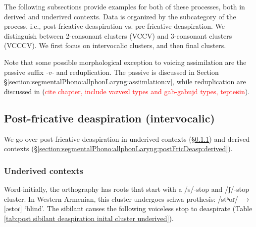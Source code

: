   	The following subsections provide examples for both of these processes, both in derived and underived contexts. Data is organized by the subcategory of the process, i.e., post-fricative deaspiration vs. pre-fricative deaspiration. We distinguish between 2-consonant clusters (VCCV) and 3-consonant clusters (VCCCV). We first focus on intervocalic clusters, and then final clusters. 
   	
   	Note that some possible morphological exception to voicing assimilation are the passive suffix \textit{-v-} and reduplication. The passive is discussed in Section \S\ref{section:segmentalPhono:allphonLaryng:assiimlation:v}, while reduplication are discussed in (\textcolor{red}{cite chapter, include vazvezl types and gab-gabujd types, tepteʁin}). 
   	
   	
   	\subsection{Post-fricative deaspiration (intervocalic)}\label{section:segmentalPhono:allphonLaryng:postFricDeasp}
   	We go over post-fricative deaspiration in underived contexts (\S\ref{section:segmentalPhono:allphonLaryng:postFricDeasp:underived}) and derived contexts (\S\ref{section:segmentalPhono:allphonLaryng:postFricDeasp:derived}). 
   	\subsubsection{Underived contexts}\label{section:segmentalPhono:allphonLaryng:postFricDeasp:underived}
   	
   	
   	Word-initially, the orthography has roots that start with a /s/-stop and /ʃ/-stop cluster. In Western Armenian, this cluster undergoes schwa prothesis: /stʰoɾ/ $\rightarrow$ [əstoɾ] `blind'. The sibilant causes the following voiceless stop to deaspirate (Table \ref{tab:post sibilant deaspiration inital cluster underived}). 
   	
